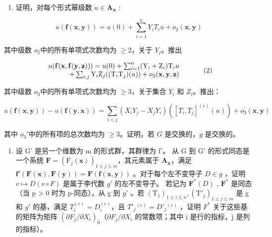 \begin{enumerate}
\def\labelenumi{(\alph{enumi})}
\setcounter{enumi}{2}
\tightlist
\item
  证明，对每个形式幂级数 \(u \in \mathbf{A}_{\mathbf{x}}\) :
\end{enumerate}

\[
u (\mathbf {f} (\mathbf {x}, \mathbf {y})) = u (0) + \sum_ {i = 1} ^ {n} Y _ {i} T _ {i} u + o _ {2} (\mathbf {x}, \mathbf {y})\tag{1}
\]

其中级数 \(o_{2}\)中的所有单项式次数均为 \(\geqslant2\)，关于 \(Y_{j}\)。推出

\[
\begin{array}{r l} {u (\mathbf {f} (\mathbf {x}, \mathbf {f} (\mathbf {y}, \mathbf {z}))) = u (0) + \sum_ {i = 1} ^ {n} (\mathrm{Y} _ {i} + \mathrm{Z} _ {i}) \mathrm{T} _ {i} u} & \\ {+ \sum_ {i, j} \mathrm{Y} _ {i} \mathrm{Z} _ {j} ((\mathrm{T} _ {i} \mathrm{T} _ {j}) (u)) + o _ {3} (\mathbf {x}, \mathbf {y}, \mathbf {z})} & \end{array}\tag{2}
\]

其中级数 \(o_{3}\)中的所有单项式次数均为 \(\geqslant3\)，关于集合 \(Y_{i}\) 和 \(Z_{i}\)。推出：

\[
u (\mathbf {f} (\mathbf {x}, \mathbf {y})) - u (\mathbf {f} (\mathbf {y}, \mathbf {x})) = \sum_ {i <   j} (X _ {i} Y _ {j} - X _ {j} Y _ {i}) ([ T _ {i}, T _ {j} ] ^ {(e)} (u)) + o _ {3} ^ {\prime} (\mathbf {x}, \mathbf {y})\tag{3}
\]

其中 \(o_3'\)中的所有项的总次数均为 \(\geqslant 3\)。证明，若 \(G\) 是交换的，\(g\) 是交换的。

\begin{enumerate}
\def\labelenumi{(\alph{enumi})}
\setcounter{enumi}{3}
\tightlist
\item
  设 G' 是另一个维数为 m 的形式群，其群律为 f'。 从 G 到 G' 的形式同态是一个系统 \(\mathbf{F} = (\mathrm{F}_{j}(\mathbf{x}))_{1 \leqslant j \leqslant m}\)，其元素属于 \(\mathbf{A}_{\mathbf{x}}\)，满足 \(\mathbf{f}'(\mathbf{F}(\mathbf{x}), \mathbf{F}(\mathbf{y})) = \mathbf{F}(\mathbf{f}(\mathbf{x}, \mathbf{y}))\) 。对于每个左不变导子 \(D \in g\) ，证明 \(v \mapsto D(v \circ F)\) 是属于李代数 \(g'\) 的左不变导子。 若记为 \(\mathbf{F}^*(D)\) , \(\mathbf{F}^*\)  是同态（当 p \textgreater{} 0 时为 p-同态），从 g 到 \(g'\) 。若 \((\mathrm{T}_{1})_{1 \leqslant i \leqslant n}, (\mathrm{T}'_{j})_{1 \leqslant j \leqslant m}\) 是 g 和 \(g'\) 的基，满足 \(T_{i}^{(e)} = D_{i}^{(e)}\)，且 \(T'_{j}{}^{(e)} = D'_{j}{}^{(e)}\) ，证明 \(F^*\) 关于这些基的矩阵为矩阵 \((\partial F_{j}/\partial X_{i})_{0}\)（\(\partial F_{j}/\partial X_{i}\)  的常数项；其中 i 是行的指标，j 是列的指标）。
\end{enumerate}

